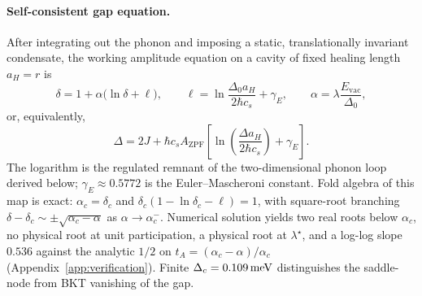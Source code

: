 \documentclass[11pt,letterpaper]{article}
\begin{document}
\paragraph{Self-consistent gap equation.}
After integrating out the phonon and imposing a static, translationally invariant condensate, the working amplitude equation on a cavity of fixed healing length $a_H=r$ is
\begin{equation}
\delta = 1 + \alpha\bigl(\ln\delta + \ell\bigr),
\qquad
\ell=\ln\frac{\Delta_0 a_H}{2\hbar c_s}+\gamma_E,
\qquad
\alpha=\lambda\frac{E_{\mathrm{vac}}}{\Delta_0},
\label{eq:dimless_gap_sketch}
\end{equation}
or, equivalently,
\begin{equation}
\boxed{\Delta = 2J + \hbar c_s A_{\text{ZPF}} \left[ \ln\left(\frac{\Delta a_H}{2\hbar c_s}\right) + \gamma_E \right].}
\label{eq:gap}
\end{equation}
The logarithm is the regulated remnant of the two-dimensional phonon loop derived below; $\gamma_E\approx 0.5772$ is the Euler--Mascheroni constant. Fold algebra of this map is exact: $\alpha_c=\delta_c$ and $\delta_c(1-\ln\delta_c-\ell)=1$, with square-root branching $\delta-\delta_c\sim\pm\sqrt{\alpha_c-\alpha}$ as $\alpha\to\alpha_c^-$. Numerical solution yields two real roots below $\alpha_c$, no physical root at unit participation, a physical root at $\lambda^\star$, and a log-log slope $0.536$ against the analytic $1/2$ on $t_A=(\alpha_c-\alpha)/\alpha_c$ (Appendix~\ref{app:verification}). Finite $\Delta_c=0.109\,\mathrm{meV}$ distinguishes the saddle-node from BKT vanishing of the gap.
\end{document}
